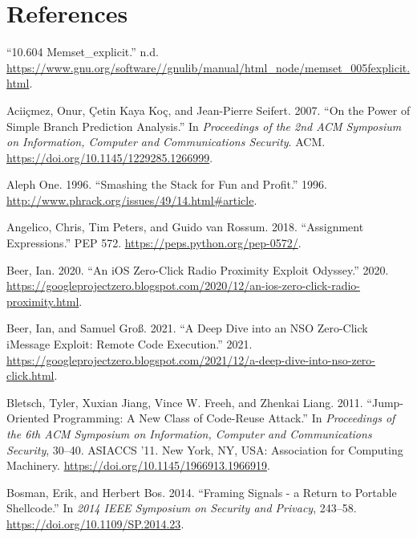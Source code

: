 \documentclass[
  a4paper,
]{report}
\newlength{\cslhangindent}
\newenvironment{CSLReferences}[2] %
{\begin{list}{}{%
	\setlength{\itemindent}{0pt}
	\setlength{\leftmargin}{0pt}
	\setlength{\parsep}{0pt}
	\ifodd #1
	\setlength{\leftmargin}{\cslhangindent}
	\setlength{\itemindent}{-1\cslhangindent}
	\fi
	\setlength{\itemsep}{#2\baselineskip}}}
{\end{list}}
\begin{document}
\printindex

\chapter*{References}\label{references}

\label{refs}
\begin{CSLReferences}{1}{0}
{``10.604 Memset\_explicit.''} n.d.
\url{https://www.gnu.org/software//gnulib/manual/html_node/memset_005fexplicit.html}.

Aciiçmez, Onur, Çetin Kaya Koç, and Jean-Pierre Seifert. 2007. {``On the
Power of Simple Branch Prediction Analysis.''} In \emph{Proceedings of
the 2nd {ACM} Symposium on Information, Computer and Communications
Security}. {ACM}. \url{https://doi.org/10.1145/1229285.1266999}.

Aleph One. 1996. {``Smashing the Stack for Fun and Profit.''} 1996.
\url{http://www.phrack.org/issues/49/14.html\#article}.

Angelico, Chris, Tim Peters, and Guido van Rossum. 2018. {``Assignment
Expressions.''} PEP 572. \url{https://peps.python.org/pep-0572/}.

Beer, Ian. 2020. {``An iOS Zero-Click Radio Proximity Exploit
Odyssey.''} 2020.
\url{https://googleprojectzero.blogspot.com/2020/12/an-ios-zero-click-radio-proximity.html}.

Beer, Ian, and Samuel Groß. 2021. {``A Deep Dive into an NSO Zero-Click
iMessage Exploit: Remote Code Execution.''} 2021.
\url{https://googleprojectzero.blogspot.com/2021/12/a-deep-dive-into-nso-zero-click.html}.

Bletsch, Tyler, Xuxian Jiang, Vince W. Freeh, and Zhenkai Liang. 2011.
{``Jump-Oriented Programming: A New Class of Code-Reuse Attack.''} In
\emph{Proceedings of the 6th ACM Symposium on Information, Computer and
Communications Security}, 30--40. ASIACCS '11. New York, NY, USA:
Association for Computing Machinery.
\url{https://doi.org/10.1145/1966913.1966919}.

Bosman, Erik, and Herbert Bos. 2014. {``Framing Signals - a Return to
Portable Shellcode.''} In \emph{2014 IEEE Symposium on Security and
Privacy}, 243--58. \url{https://doi.org/10.1109/SP.2014.23}.


\end{CSLReferences}
\end{document}
